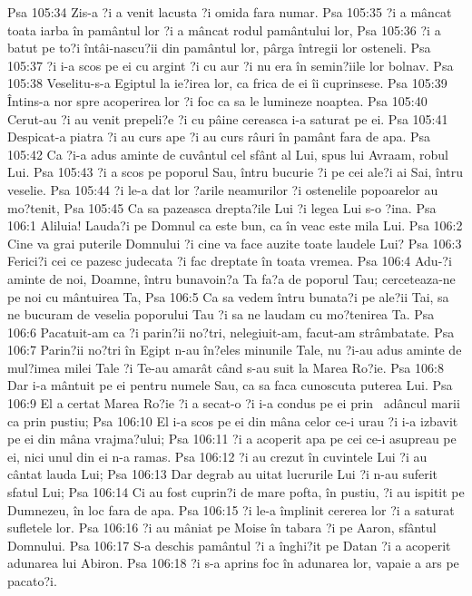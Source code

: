 Psa 105:34  Zis-a ?i a venit lacusta ?i omida fara numar.
Psa 105:35  ?i a mâncat toata iarba în pamântul lor ?i a mâncat rodul pamântului lor,
Psa 105:36  ?i a batut pe to?i întâi-nascu?ii din pamântul lor, pârga întregii lor osteneli.
Psa 105:37  ?i i-a scos pe ei cu argint ?i cu aur ?i nu era în semin?iile lor bolnav.
Psa 105:38  Veselitu-s-a Egiptul la ie?irea lor, ca frica de ei îi cuprinsese.
Psa 105:39  Întins-a nor spre acoperirea lor ?i foc ca sa le lumineze noaptea.
Psa 105:40  Cerut-au ?i au venit prepeli?e ?i cu pâine cereasca i-a saturat pe ei.
Psa 105:41  Despicat-a piatra ?i au curs ape ?i au curs râuri în pamânt fara de apa.
Psa 105:42  Ca ?i-a adus aminte de cuvântul cel sfânt al Lui, spus lui Avraam, robul Lui.
Psa 105:43  ?i a scos pe poporul Sau, întru bucurie ?i pe cei ale?i ai Sai, întru veselie.
Psa 105:44  ?i le-a dat lor ?arile neamurilor ?i ostenelile popoarelor au mo?tenit,
Psa 105:45  Ca sa pazeasca drepta?ile Lui ?i legea Lui s-o ?ina.
Psa 106:1  Aliluia! Lauda?i pe Domnul ca este bun, ca în veac este mila Lui.
Psa 106:2  Cine va grai puterile Domnului ?i cine va face auzite toate laudele Lui?
Psa 106:3  Ferici?i cei ce pazesc judecata ?i fac dreptate în toata vremea.
Psa 106:4  Adu-?i aminte de noi, Doamne, întru bunavoin?a Ta fa?a de poporul Tau; cerceteaza-ne pe noi cu mântuirea Ta,
Psa 106:5  Ca sa vedem întru bunata?i pe ale?ii Tai, sa ne bucuram de veselia poporului Tau ?i sa ne laudam cu mo?tenirea Ta.
Psa 106:6  Pacatuit-am ca ?i parin?ii no?tri, nelegiuit-am, facut-am strâmbatate.
Psa 106:7  Parin?ii no?tri în Egipt n-au în?eles minunile Tale, nu ?i-au adus aminte de mul?imea milei Tale ?i Te-au amarât când s-au suit la Marea Ro?ie.
Psa 106:8  Dar i-a mântuit pe ei pentru numele Sau, ca sa faca cunoscuta puterea Lui.
Psa 106:9  El a certat Marea Ro?ie ?i a secat-o ?i i-a condus pe ei prin  adâncul marii ca prin pustiu;
Psa 106:10  El i-a scos pe ei din mâna celor ce-i urau ?i i-a izbavit pe ei din mâna vrajma?ului;
Psa 106:11  ?i a acoperit apa pe cei ce-i asupreau pe ei, nici unul din ei n-a ramas.
Psa 106:12  ?i au crezut în cuvintele Lui ?i au cântat lauda Lui;
Psa 106:13  Dar degrab au uitat lucrurile Lui ?i n-au suferit sfatul Lui;
Psa 106:14  Ci au fost cuprin?i de mare pofta, în pustiu, ?i au ispitit pe Dumnezeu, în loc fara de apa.
Psa 106:15  ?i le-a împlinit cererea lor ?i a saturat sufletele lor.
Psa 106:16  ?i au mâniat pe Moise în tabara ?i pe Aaron, sfântul Domnului.
Psa 106:17  S-a deschis pamântul ?i a înghi?it pe Datan ?i a acoperit adunarea lui Abiron.
Psa 106:18  ?i s-a aprins foc în adunarea lor, vapaie a ars pe pacato?i.
